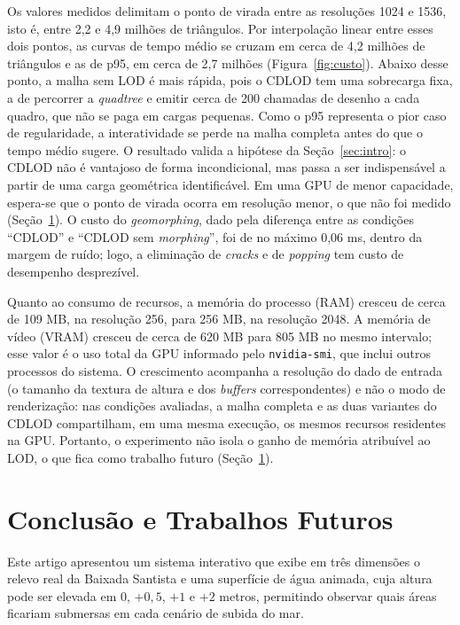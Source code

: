 \documentclass[conference]{IEEEtran}
\begin{document}
Os valores medidos delimitam o ponto de virada entre as resoluções 1024 e
1536, isto é, entre 2,2 e 4,9 milhões de triângulos. Por interpolação linear
entre esses dois pontos, as curvas de tempo médio se cruzam em cerca de 4,2
milhões de triângulos e as de p95, em cerca de 2,7 milhões
(Figura~\ref{fig:custo}). Abaixo desse ponto, a malha sem LOD é mais rápida,
pois o CDLOD tem uma sobrecarga fixa, a de percorrer a \emph{quadtree} e
emitir cerca de 200 chamadas de desenho a cada quadro, que não se paga em
cargas pequenas. Como o p95 representa o pior caso de regularidade, a
interatividade se perde na malha completa antes do que o tempo médio sugere.
O resultado valida a hipótese da Seção~\ref{sec:intro}: o CDLOD não é
vantajoso de forma incondicional, mas passa a ser indispensável a partir de
uma carga geométrica identificável. Em uma GPU de menor capacidade, espera-se que o ponto de virada ocorra em resolução
menor, o que não foi medido (Seção~\ref{sec:conclusao}). O custo do
\emph{geomorphing}, dado pela diferença entre as condições ``CDLOD'' e
``CDLOD sem \emph{morphing}'', foi de no máximo 0,06 ms, dentro da margem de
ruído; logo, a eliminação de \emph{cracks} e de \emph{popping} tem custo de
desempenho desprezível.

Quanto ao consumo de recursos, a memória do processo (RAM) cresceu de cerca
de 109 MB, na resolução 256, para 256 MB, na resolução 2048. A memória de
vídeo (VRAM) cresceu de cerca de 620 MB para 805 MB no mesmo intervalo; esse
valor é o uso total da GPU informado pelo \texttt{nvidia-smi}, que inclui
outros processos do sistema. O crescimento acompanha a resolução do dado de
entrada (o tamanho da textura de altura e dos \emph{buffers}
correspondentes) e não o modo de renderização: nas condições avaliadas, a
malha completa e as duas variantes do CDLOD compartilham, em uma mesma
execução, os mesmos recursos residentes na GPU. Portanto, o experimento não
isola o ganho de memória atribuível ao LOD, o que fica como trabalho futuro
(Seção~\ref{sec:conclusao}).

\section{Conclusão e Trabalhos Futuros}
\label{sec:conclusao}

Este artigo apresentou um sistema interativo que exibe em três dimensões o
relevo real da Baixada Santista e uma superfície de água animada, cuja
altura pode ser elevada em 0, $+0{,}5$, $+1$ e $+2$ metros, permitindo
observar quais áreas ficariam submersas em cada cenário de subida do mar.
\end{document}

